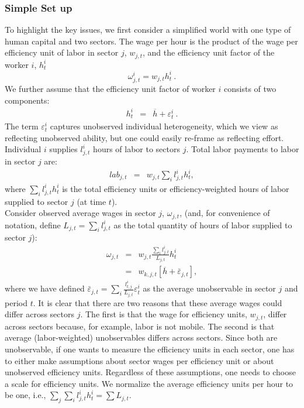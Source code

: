 \documentclass[10pt]{article}
\begin{document}
\subsubsection{Simple Set up}
To highlight the key issues, we first consider a simplified world with one type of human capital and two sectors. The wage per hour is the product of the wage per efficiency unit of labor in sector $j$, $w_{j,t}$, and the efficiency unit factor of the worker $i$, $h_{t}^{i}$
\begin{equation} \label{eq:eff wage-simple}
\omega_{j,t}^{i}=w_{j,t}h_{t}^{i} \ . 
\end{equation}
We further assume that the efficiency unit factor of worker $i$ consists of two components: 
\begin{eqnarray*}
h_{t}^{i} & = & \overline{h}+\varepsilon^{i}_{t} \ .
\end{eqnarray*}
The term $\varepsilon^{i}_{t}$ captures unobserved individual heterogeneity, which we view as reflecting unobserved ability, but one could easily re-frame as reflecting effort.\\

Individual $i$ supplies $l_{j,t}^{i}$ hours of labor to sectors $j.$ Total labor payments to labor in sector $j$ are:
\begin{eqnarray} \label{eq:Compensation-1}
lab_{j,t} & = & w_{j,t}\sum_{i}l_{j,t}^{i}h_{t}^{i} , 
\end{eqnarray}
where $\sum_{i}l_{j,t}^{i}h_{t}^{i}$ is the total efficiency units or efficiency-weighted hours of labor supplied to sector $j$ (at time $t$).\\ 

Consider observed average wages in sector $j$, $\omega_{j,t}$, (and, for convenience of notation, define $L_{j,t}=\sum_{i}l_{j,t}^{i}$ as the total quantity of hours of labor supplied to sector $j$):
\begin{eqnarray*}
\omega_{j,t} & = & w_{j,t}\frac{\sum_{i}l_{j,t}^{i}}{L_{j,t}}h_{t}^{i}\\
 & = & w_{k,j,t}\left[\overline{h}+\bar{\varepsilon}_{j,t}\right] ,
\end{eqnarray*}
where we have defined $\bar{\varepsilon}_{j,t}=\sum_{i}\frac{l_{t,j}^{i}}{L_{j,t}}\varepsilon^{i}_{t}$ as the average unobservable in sector $j$ and period $t$. It is clear that there are two reasons that these average wages could differ across sectors $j$. The first is that the wage for efficiency units, $w_{j,t}$, differ across sectors because, for example, labor is not mobile. The second is that average (labor-weighted) unobservables differs across sectors. Since both are unobservable, if one wants to measure the efficiency units in each sector, one has to either make assumptions
about sector wages per efficiency unit or about unobserved efficiency units. Regardless of these assumptions, one needs to choose a scale for efficiency units. We normalize the average efficiency units per hour to be one, i.e., $\sum_{j}\sum_{i}l_{j,t}^{i}h_{t}^{i}=\sum L_{j,t}$.\\
\end{document}
